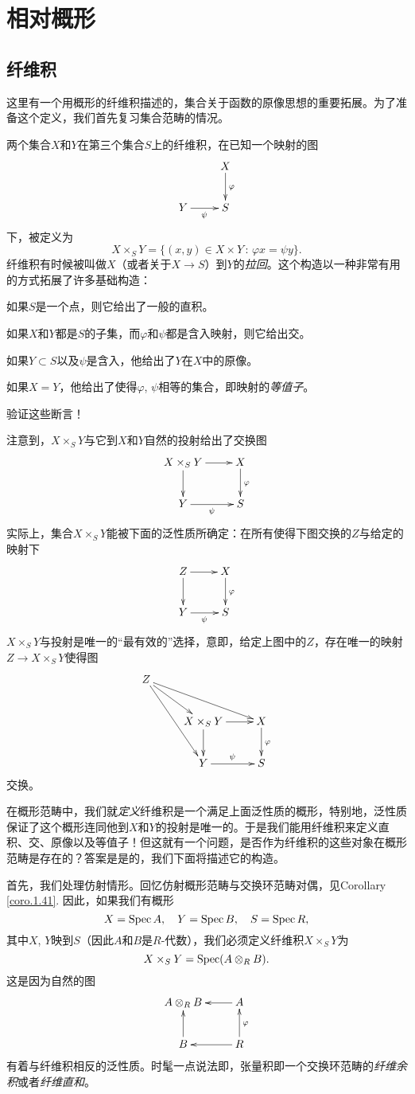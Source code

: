 \section{相对概形}
\subsection{纤维积} \label{s.1.3.1}

这里有一个用概形的纤维积描述的，集合关于函数的原像思想的重要拓展。为了准备这个定义，我们首先复习集合范畴的情况。

两个集合$X$和$Y$在第三个集合$S$上的纤维积，在已知一个映射的图
\[
	\xymatrix{
	&X\ar[d]^\varphi\\
	Y\ar[r]_\psi &S
	}
\]
下，被定义为
\[
	X\times_S Y=\{(x,y)\in X\times Y\,:\,\varphi x=\psi y\}.
\]
纤维积有时候被叫做$X$（或者关于$X\to S$）到$Y$的\textit{拉回}。这个构造以一种非常有用的方式拓展了许多基础构造：

如果$S$是一个点，则它给出了一般的直积。

如果$X$和$Y$都是$S$的子集，而$\varphi$和$\psi$都是含入映射，则它给出交。

如果$Y\subset S$以及$\psi$是含入，他给出了$Y$在$X$中的原像。

如果$X=Y$，他给出了使得$\varphi$, $\psi$相等的集合，即映射的\textit{等值子}。

\begin{exe}
	验证这些断言！
\end{exe}

注意到，$X\times_S Y$与它到$X$和$Y$自然的投射给出了交换图
\[
	\xymatrix{
	X\times_S Y\ar[r]\ar[d]&X\ar[d]^\varphi\\
	Y\ar[r]_\psi &S
	}
\]
实际上，集合$X\times_S Y$能被下面的泛性质所确定：在所有使得下图交换的$Z$与给定的映射下
\[
	\xymatrix{
	Z\ar[r]\ar[d]&X\ar[d]^\varphi\\
	Y\ar[r]_\psi &S
	}
\]
$X\times_S Y$与投射是唯一的“最有效的”选择，意即，给定上图中的$Z$，存在唯一的映射$Z\to X\times_S Y$使得图
\[
	\xymatrix{
	Z\ar[dr]\ar[ddr]\ar[drr] & &\\
	& X\times_S Y \ar[r]\ar[d] &  X \ar[d]^\varphi\\
	& Y\ar[r]^\psi &  S
	}
\]
交换。

在概形范畴中，我们就\textit{定义}纤维积是一个满足上面泛性质的概形，特别地，泛性质保证了这个概形连同他到$X$和$Y$的投射是唯一的。于是我们能用纤维积来定义直积、交、原像以及等值子！但这就有一个问题，是否作为纤维积的这些对象在概形范畴是存在的？答案是是的，我们下面将描述它的构造。

首先，我们处理仿射情形。回忆仿射概形范畴与交换环范畴对偶，见Corollary \ref{coro.1.41}. 因此，如果我们有概形
\[
	X=\operatorname{Spec} A,\quad Y=\operatorname{Spec} B,\quad S=\operatorname{Spec} R,
\]
其中$X$, $Y$映到$S$（因此$A$和$B$是$R$\hyp 代数），我们必须定义纤维积$X\times_S Y$为
\[
	X\times_S Y=\operatorname{Spec}(A\otimes_R B).
\]
这是因为自然的图
\[
	\xymatrix{
	A\otimes_R B&A\ar[l]\\
	B\ar[u]&R\ar[l]\ar[u]_\varphi
	}
\]
有着与纤维积相反的泛性质。时髦一点说法即，张量积即一个交换环范畴的\textit{纤维余积}或者\textit{纤维直和}。

